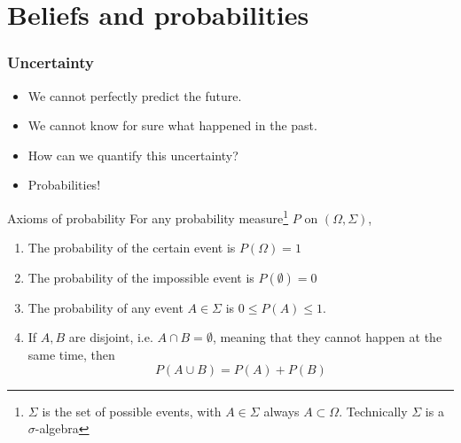 \section{Beliefs and probabilities}



\begin{frame}
  \frametitle{Uncertainty}
  \begin{itemize}
  \item We cannot perfectly predict the future.
  \item We cannot know for sure what happened in the past.
  \item How can we quantify this uncertainty?
  \item Probabilities!
  \end{itemize}
  \begin{block}{Axioms of probability}
    For any probability measure\footnote{$\Sigma$ is the set of possible events, with $A \in \Sigma$ always $A \subset \Omega$. Technically $\Sigma$ is a $\sigma$-algebra} $P$ on $(\Omega, \Sigma)$,
    \begin{enumerate}
    \item<2-> The probability of the certain event is $P(\Omega) = 1$
    \item<3->The probability of the impossible event is
      $P(\emptyset) = 0$
    \item<4->The probability of any event $A \in \Sigma$ is $0 \leq P(A) \leq 1$.
    \item<5-> If $A, B$ are disjoint, i.e. $A \cap B = \emptyset$, meaning
      that they cannot happen at the same time, then
      \[
      P(A \cup B) = P(A) + P(B)
      \]
    \end{enumerate}
  \end{block}
\end{frame}

